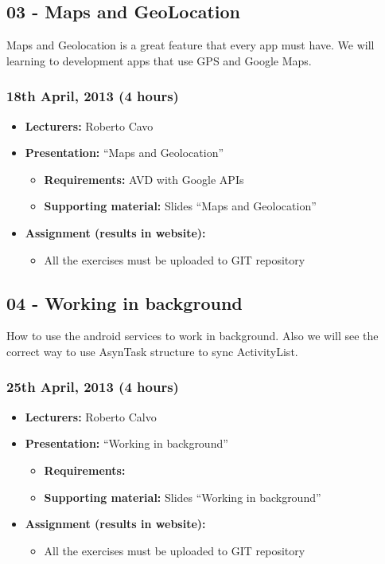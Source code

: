 \documentclass[a4paper]{article}
\begin{document}
\subsection{03 - Maps and GeoLocation}

Maps and Geolocation is a great feature that every app must have. We
will learning to development apps that use GPS and Google Maps.


\subsubsection{18th April, 2013 (4 hours)}

\begin{itemize}
\item \textbf{Lecturers:} Roberto Cavo
\item \textbf{Presentation:} ``Maps and Geolocation''
  \begin{itemize}
  \item \textbf{Requirements:} AVD with Google APIs
  \item \textbf{Supporting material:} Slides ``Maps and Geolocation''
  \end{itemize}
\item \textbf{Assignment (results in website):} 
  \begin{itemize}
  \item All the exercises must be uploaded to GIT repository
  \end{itemize}
\end{itemize}


\subsection{04 - Working in background }

How to use the android services to work in background. Also we will
see the correct way to use AsynTask structure to sync ActivityList.

\subsubsection{25th April, 2013 (4 hours)}

\begin{itemize}
\item \textbf{Lecturers:} Roberto Calvo
\item \textbf{Presentation:} ``Working in background''
  \begin{itemize}
\item \textbf{Requirements:} 
  \item \textbf{Supporting material:} Slides ``Working in background''
  \end{itemize}
\item \textbf{Assignment (results in website):} 
 \begin{itemize}
   \item All the exercises must be uploaded to GIT repository
 \end{itemize}
\end{itemize}
\end{document}
